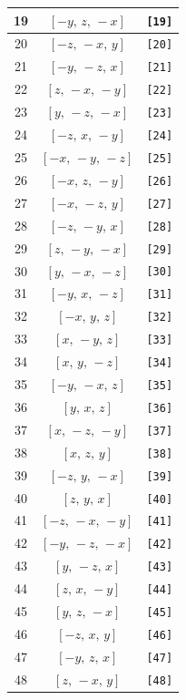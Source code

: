 \documentclass[fleqn,8pt]{jsarticle}
\begin{document}
\begin{longtable}{ccc}
19 & $\left[ - y,\, z,\, - x \right]$ & {\tt [19]} \\ \hline
20 & $\left[ - z,\, - x,\, y \right]$ & {\tt [20]} \\ \hline
21 & $\left[ - y,\, - z,\, x \right]$ & {\tt [21]} \\ \hline
22 & $\left[ z,\, - x,\, - y \right]$ & {\tt [22]} \\ \hline
23 & $\left[ y,\, - z,\, - x \right]$ & {\tt [23]} \\ \hline
24 & $\left[ - z,\, x,\, - y \right]$ & {\tt [24]} \\ \hline
25 & $\left[ - x,\, - y,\, - z \right]$ & {\tt [25]} \\ \hline
26 & $\left[ - x,\, z,\, - y \right]$ & {\tt [26]} \\ \hline
27 & $\left[ - x,\, - z,\, y \right]$ & {\tt [27]} \\ \hline
28 & $\left[ - z,\, - y,\, x \right]$ & {\tt [28]} \\ \hline
29 & $\left[ z,\, - y,\, - x \right]$ & {\tt [29]} \\ \hline
30 & $\left[ y,\, - x,\, - z \right]$ & {\tt [30]} \\ \hline
31 & $\left[ - y,\, x,\, - z \right]$ & {\tt [31]} \\ \hline
32 & $\left[ - x,\, y,\, z \right]$ & {\tt [32]} \\ \hline
33 & $\left[ x,\, - y,\, z \right]$ & {\tt [33]} \\ \hline
34 & $\left[ x,\, y,\, - z \right]$ & {\tt [34]} \\ \hline
35 & $\left[ - y,\, - x,\, z \right]$ & {\tt [35]} \\ \hline
36 & $\left[ y,\, x,\, z \right]$ & {\tt [36]} \\ \hline
37 & $\left[ x,\, - z,\, - y \right]$ & {\tt [37]} \\ \hline
38 & $\left[ x,\, z,\, y \right]$ & {\tt [38]} \\ \hline
39 & $\left[ - z,\, y,\, - x \right]$ & {\tt [39]} \\ \hline
40 & $\left[ z,\, y,\, x \right]$ & {\tt [40]} \\ \hline
41 & $\left[ - z,\, - x,\, - y \right]$ & {\tt [41]} \\ \hline
42 & $\left[ - y,\, - z,\, - x \right]$ & {\tt [42]} \\ \hline
43 & $\left[ y,\, - z,\, x \right]$ & {\tt [43]} \\ \hline
44 & $\left[ z,\, x,\, - y \right]$ & {\tt [44]} \\ \hline
45 & $\left[ y,\, z,\, - x \right]$ & {\tt [45]} \\ \hline
46 & $\left[ - z,\, x,\, y \right]$ & {\tt [46]} \\ \hline
47 & $\left[ - y,\, z,\, x \right]$ & {\tt [47]} \\ \hline
48 & $\left[ z,\, - x,\, y \right]$ & {\tt [48]} \\
\end{longtable}
\end{document}
